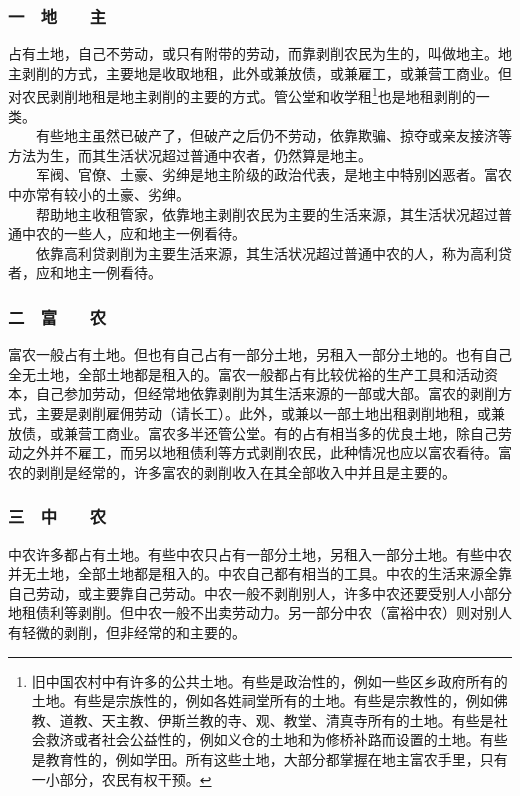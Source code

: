 \documentclass[cn,11pt,chinese]{elegantbook}
\def\myformat#1{\hfil\hfil #1}
\begin{document}
\subsubsection*{\myformat{一　地　　主}}
占有土地，自己不劳动，或只有附带的劳动，而靠剥削农民为生的，叫做地主。地主剥削的方式，主要地是收取地租，此外或兼放债，或兼雇工，或兼营工商业。但对农民剥削地租是地主剥削的主要的方式。管公堂和收学租\footnote[1]{ 旧中国农村中有许多的公共土地。有些是政治性的，例如一些区乡政府所有的土地。有些是宗族性的，例如各姓祠堂所有的土地。有些是宗教性的，例如佛教、道教、天主教、伊斯兰教的寺、观、教堂、清真寺所有的土地。有些是社会救济或者社会公益性的，例如义仓的土地和为修桥补路而设置的土地。有些是教育性的，例如学田。所有这些土地，大部分都掌握在地主富农手里，只有一小部分，农民有权干预。}也是地租剥削的一类。\\
　　有些地主虽然已破产了，但破产之后仍不劳动，依靠欺骗、掠夺或亲友接济等方法为生，而其生活状况超过普通中农者，仍然算是地主。\\
　　军阀、官僚、土豪、劣绅是地主阶级的政治代表，是地主中特别凶恶者。富农中亦常有较小的土豪、劣绅。\\
　　帮助地主收租管家，依靠地主剥削农民为主要的生活来源，其生活状况超过普通中农的一些人，应和地主一例看待。\\
　　依靠高利贷剥削为主要生活来源，其生活状况超过普通中农的人，称为高利贷者，应和地主一例看待。\\
\subsubsection*{\myformat{二　富　　农}}
富农一般占有土地。但也有自己占有一部分土地，另租入一部分土地的。也有自己全无土地，全部土地都是租入的。富农一般都占有比较优裕的生产工具和活动资本，自己参加劳动，但经常地依靠剥削为其生活来源的一部或大部。富农的剥削方式，主要是剥削雇佣劳动（请长工）。此外，或兼以一部土地出租剥削地租，或兼放债，或兼营工商业。富农多半还管公堂。有的占有相当多的优良土地，除自己劳动之外并不雇工，而另以地租债利等方式剥削农民，此种情况也应以富农看待。富农的剥削是经常的，许多富农的剥削收入在其全部收入中并且是主要的。\\
\subsubsection*{\myformat{三　中　　农}}
中农许多都占有土地。有些中农只占有一部分土地，另租入一部分土地。有些中农并无土地，全部土地都是租入的。中农自己都有相当的工具。中农的生活来源全靠自己劳动，或主要靠自己劳动。中农一般不剥削别人，许多中农还要受别人小部分地租债利等剥削。但中农一般不出卖劳动力。另一部分中农（富裕中农）则对别人有轻微的剥削，但非经常的和主要的。\\
\end{document}
